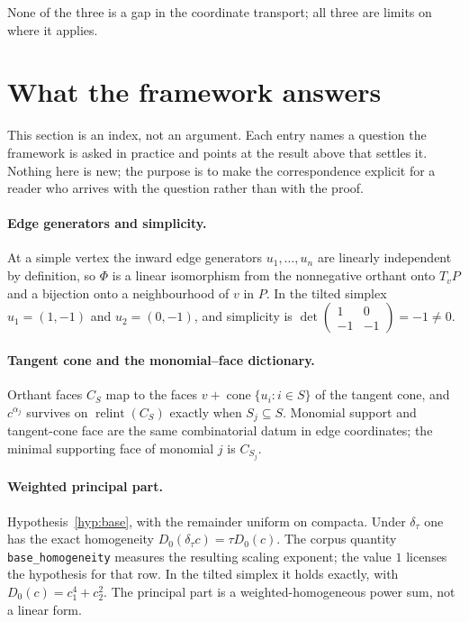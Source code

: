 \documentclass[11pt]{article}
\theoremstyle{definition}
\theoremstyle{remark}
\DeclareMathOperator{\cone}{cone}
\DeclareMathOperator{\relint}{relint}
\begin{document}
None of the three is a gap in the coordinate transport; all three are limits
on where it applies.


\section{What the framework answers}

This section is an index, not an argument. Each entry names a question the
framework is asked in practice and points at the result above that settles it.
Nothing here is new; the purpose is to make the correspondence explicit for a
reader who arrives with the question rather than with the proof.

\paragraph{Edge generators and simplicity.}
At a simple vertex the inward edge generators $u_1,\dots,u_n$ are linearly
independent by definition, so $\Phi$ is a linear isomorphism from the
nonnegative orthant onto $T_vP$ and a bijection onto a neighbourhood of $v$ in
$P$. In the tilted simplex $u_1=(1,-1)$ and $u_2=(0,-1)$, and simplicity is
$\det\left(\begin{smallmatrix}1&0\\-1&-1\end{smallmatrix}\right)=-1\ne0$.

\paragraph{Tangent cone and the monomial--face dictionary.}
Orthant faces $C_S$ map to the faces $v+\cone\{u_i:i\in S\}$ of the tangent
cone, and $c^{\alpha_j}$ survives on $\relint(C_S)$ exactly when
$S_j\subseteq S$. Monomial support and tangent-cone face are the same
combinatorial datum in edge coordinates; the minimal supporting face of
monomial $j$ is $C_{S_j}$.

\paragraph{Weighted principal part.}
Hypothesis~\ref{hyp:base}, with the remainder uniform on compacta. Under
$\delta_\tau$ one has the exact homogeneity $D_0(\delta_\tau c)=\tau D_0(c)$.
The corpus quantity \texttt{base\_homogeneity} measures the resulting scaling
exponent; the value $1$ licenses the hypothesis for that row. In the tilted
simplex it holds exactly, with $D_0(c)=c_1^4+c_2^2$. The principal part is a
weighted-homogeneous power sum, not a linear form.
\end{document}
